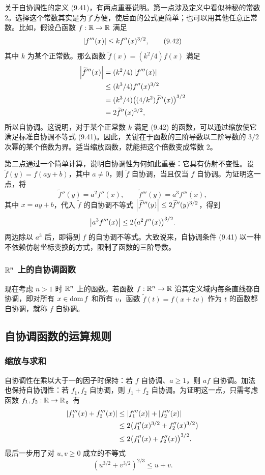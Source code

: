 关于自协调性的定义 (9.41)，有两点重要说明。第一点涉及定义中看似神秘的常数 $2$。选择这个常数其实是为了方便，使后面的公式更简单；也可以用其他任意正常数。比如，假设凸函数 $f:\mathbb R\to\mathbb R$ 满足
\begin{equation}
 \left\lvert f'''(x)\right\rvert\le kf''(x)^{3/2},\tag{9.42}
\end{equation}
其中 $k$ 为某个正常数。那么函数 $\widetilde f(x)=(k^2/4)f(x)$ 满足
\[
\begin{aligned}
 \left\lvert \widetilde f'''(x)\right\rvert&=(k^2/4)\left\lvert f'''(x)\right\rvert\\
 &\le(k^3/4)f''(x)^{3/2}\\
 &=(k^3/4)\bigl((4/k^2)\widetilde f''(x)\bigr)^{3/2}\\
 &=2\widetilde f''(x)^{3/2},
\end{aligned}
\]
所以自协调。这说明，对于某个正常数 $k$ 满足 (9.42) 的函数，可以通过缩放使它满足标准自协调不等式 (9.41)。因此，关键在于函数的三阶导数以二阶导数的 $3/2$ 次幂的某个倍数为界。适当缩放函数，就能把这个倍数变成常数 $2$。

第二点通过一个简单计算，说明自协调性为何如此重要：它具有仿射不变性。设 $\widetilde f(y)=f(ay+b)$，其中 $a\ne0$，则 $\widetilde f$ 自协调，当且仅当 $f$ 自协调。为证明这一点，将
\[
 \widetilde f''(y)=a^2f''(x),\qquad
 \widetilde f'''(y)=a^3f'''(x),
\]
其中 $x=ay+b$，代入 $\widetilde f$ 的自协调不等式 $\left\lvert \widetilde f'''(y)\right\rvert\le2\widetilde f''(y)^{3/2}$，得到
\[
 \left\lvert a^3f'''(x)\right\rvert\le2\bigl(a^2f''(x)\bigr)^{3/2}.
\]
两边除以 $a^3$ 后，即得到 $f$ 的自协调不等式。大致说来，自协调条件 (9.41) 以一种不依赖仿射坐标变换的方式，限制了函数的三阶导数。

\subsubsection*{$\mathbb R^n$ 上的自协调函数}
现在考虑 $n>1$ 时 $\mathbb R^n$ 上的函数。若函数 $f:\mathbb R^n\to\mathbb R$ 沿其定义域内每条直线都自协调，即对所有 $x\in\operatorname{dom} f$ 和所有 $v$，函数 $\widetilde f(t)=f(x+tv)$ 作为 $t$ 的函数都自协调，就称 $f$ 自协调。

\subsection{自协调函数的运算规则}
\subsubsection*{缩放与求和}
自协调性在乘以大于一的因子时保持：若 $f$ 自协调、$a\ge1$，则 $af$ 自协调。加法也保持自协调性：若 $f_1,f_2$ 自协调，则 $f_1+f_2$ 自协调。为证明这一点，只需考虑函数 $f_1,f_2:\mathbb R\to\mathbb R$。有
\[
\begin{aligned}
 \left\lvert f_1'''(x)+f_2'''(x)\right\rvert
 &\le\left\lvert f_1'''(x)\right\rvert+\left\lvert f_2'''(x)\right\rvert\\
 &\le2\bigl(f_1''(x)^{3/2}+f_2''(x)^{3/2}\bigr)\\
 &\le2\bigl(f_1''(x)+f_2''(x)\bigr)^{3/2}.
\end{aligned}
\]
最后一步用了对 $u,v\ge0$ 成立的不等式
\[
 (u^{3/2}+v^{3/2})^{2/3}\le u+v.
\]

